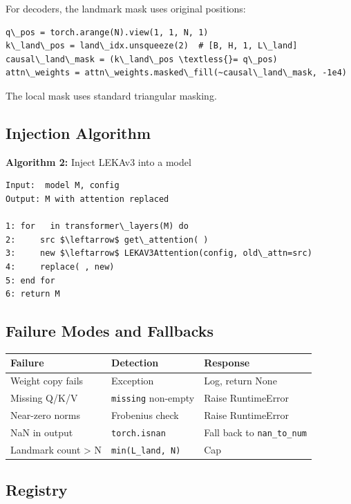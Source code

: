 For decoders, the landmark mask uses original positions:

\begin{lstlisting}
q\_pos = torch.arange(N).view(1, 1, N, 1)
k\_land\_pos = land\_idx.unsqueeze(2)  # [B, H, 1, L\_land]
causal\_land\_mask = (k\_land\_pos \textless{}= q\_pos)
attn\_weights = attn\_weights.masked\_fill(~causal\_land\_mask, -1e4)
\end{lstlisting}

The local mask uses standard triangular masking.

\subsection{Injection Algorithm}

\textbf{Algorithm 2:} Inject LEKAv3 into a model
\begin{lstlisting}
Input:  model M, config
Output: M with attention replaced

1: for   in transformer\_layers(M) do
2:     src $\leftarrow$ get\_attention( )
3:     new $\leftarrow$ LEKAV3Attention(config, old\_attn=src)
4:     replace( , new)
5: end for
6: return M
\end{lstlisting}

\subsection{Failure Modes and Fallbacks}

\begin{table}[H]
\centering
\small
\begin{tabular}{lll}
\toprule
\textbf{Failure} & \textbf{Detection} & \textbf{Response} \\
\midrule
Weight copy fails & Exception & Log, return None \\
Missing Q/K/V & \texttt{missing} non-empty & Raise RuntimeError \\
Near-zero norms & Frobenius check & Raise RuntimeError \\
NaN in output & \texttt{torch.isnan} & Fall back to \texttt{nan\_to\_num} \\
Landmark count \textgreater{} N & \texttt{min(L\_land, N)} & Cap \\
\bottomrule
\end{tabular}
\end{table}

\subsection{Registry}

